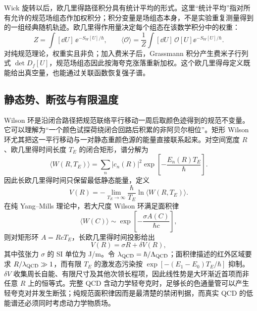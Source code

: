 Wick 旋转以后，欧几里得路径积分具有统计平均的形式。这里“统计平均”指对所有允许的规范场组态作加权积分；积分变量是场组态本身，不是实验重复测量得到的一组经典随机轨迹。欧几里得作用量决定每个组态在该数学积分中的权重：
\begin{equation*}
 Z=\int[\dd U]\,\ee^{-S_W[U]/\hbar},
 \qquad
 \langle\mathcal O\rangle
 =\frac1Z\int[\dd U]\,\mathcal O[U]\ee^{-S_W[U]/\hbar}.
\end{equation*}
对纯规范理论，权重实且非负；加入费米子后，Grassmann 积分产生费米子行列式 $\det D_f[U]$，规范场组态因此按海夸克涨落重新加权。这个欧几里得母定义既能给出真空量，也能通过关联函数恢复强子谱。

\subsection{静态势、断弦与有限温度}

Wilson 环是沿闭合路径把规范联络平行移动一周后取颜色迹得到的规范不变量。它可以理解为“一个颜色试探荷绕闭合回路后积累的非阿贝尔相位”。矩形 Wilson 环尤其把这一平行移动与一对静态重颜色源的能量直接联系起来。对空间宽度 $R$、欧几里得时间长度 $T_E$ 的闭合矩形，谱分解为
\begin{equation}
 \langle W(R,T_E)\rangle
 =\sum_n|c_n(R)|^2
 \exp\!\left[-\frac{E_n(R)T_E}{\hbar}\right].
 \label{eq:wilson-loop-spectral-dp11}
\end{equation}
因此长欧几里得时间只保留最低静态能量，定义
\begin{equation}
 \boxed{
 V(R)
 =-\lim_{T_E\to\infty}
 \frac\hbar{T_E}\ln\langle W(R,T_E)\rangle.}
 \label{eq:static-potential-from-wilson-dp11}
\end{equation}
在纯 Yang--Mills 理论中，若大尺度 Wilson 环满足面积律
\begin{equation}
 \langle W(C)\rangle
 \sim\exp\!\left[-\frac{\sigma A(C)}{\hbar c}\right],
 \label{eq:wilson-area-law-dp11}
\end{equation}
则对矩形环 $A=RcT_E$，长欧几里得时间投影给出
\begin{equation}
 \boxed{V(R)=\sigma R+\delta V(R),}
 \label{eq:linear-potential-area-law-dp11}
\end{equation}
其中弦张力 $\sigma$ 的 SI 单位为 J/m。令 $\lambda_{\rm QCD}=\hbar/\Lambda_{\rm QCD}$；面积律描述的红外区域要求 $R/\lambda_{\rm QCD}\gg1$，而有限 $T_E$ 的激发态污染按 $\exp[-(E_1-E_0)T_E/\hbar]$ 抑制。$\delta V$ 收集周长自能、有限尺寸及其他次领长程项，因此线性势是大环渐近首项而非任意 $R$ 上的恒等式。完整 QCD 含动力学轻夸克时，足够长的色通量管可以产生轻夸克对并发生断弦；纯规范面积律因而是最清楚的禁闭判据，而真实 QCD 的低能谱还必须同时考虑动力学物质场。

